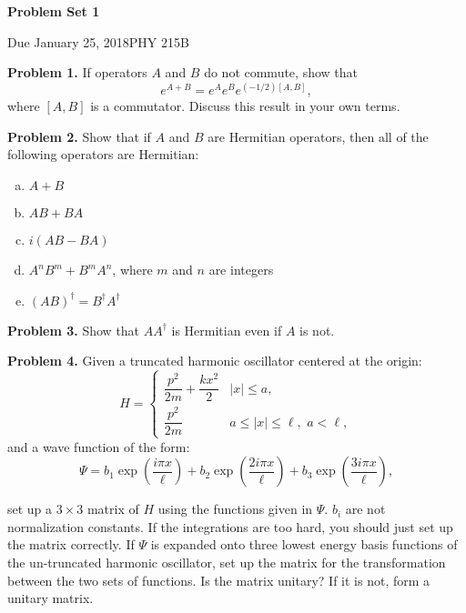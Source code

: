 \documentclass{article}
\newcommand{\Title}     {Problem Set 1}
\newcommand{\DueDate}   {January 25, 2018}
\newcommand{\Course}    {PHY 215B}
\begin{document}
{\huge\bf\Title}

Due \DueDate \hfill \Course

\hrulefill

\textbf{Problem 1.} If operators $A$ and $B$ do not commute, show that
\begin{equation*}
    e^{A+B} = e^Ae^Be^{(-1/2)[A,B]},
\end{equation*}
where $[A,B]$ is a commutator. Discuss this result in your own terms.
 
\hrulefill

\textbf{Problem 2.} Show that if $A$ and $B$ are Hermitian operators, then all of the following operators are Hermitian:
\begin{enumerate}[(a)]
    \item $A+B$
    \item $AB+BA$
    \item $i(AB-BA)$
    \item $A^nB^m + B^mA^n$, where $m$ and $n$ are integers
    \item $(AB)^\dagger = B^\dagger A^\dagger$
\end{enumerate}

\hrulefill

\textbf{Problem 3.} Show that $AA^\dagger$ is Hermitian even if $A$ is not.

\hrulefill

\textbf{Problem 4.} Given a truncated harmonic oscillator centered at the origin:
\begin{equation*}
    H = 
    \begin{cases} 
        \dfrac{p^2}{2m} + \dfrac{kx^2}{2} & |x| \leq a, \\[1em]
        \dfrac{p^2}{2m} & a \leq |x| \leq \ell, \,\, a < \ell,
    \end{cases}
\end{equation*}
and a wave function of the form:
\begin{equation*}
    \Psi = b_1\exp\left(\frac{i\pi x}{\ell}\right) + b_2\exp\left(\frac{2i\pi x}{\ell}\right) + b_3\exp\left(\frac{3i\pi x}{\ell}\right),
\end{equation*}

set up a $3\times 3$ matrix of $H$ using the functions given in $\Psi$. $b_i$ are not normalization constants. If the integrations are too hard, you should just set up the matrix correctly. If $\Psi$ is expanded onto three lowest energy basis functions of the un-truncated harmonic oscillator, set up the matrix for the transformation between the two sets of functions. Is the matrix unitary? If it is not, form a unitary matrix.
\end{document}
